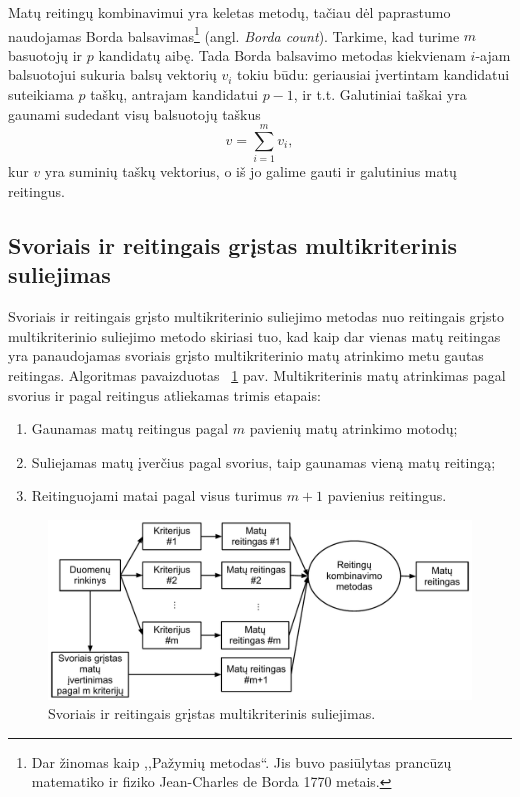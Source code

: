 Matų reitingų kombinavimui yra keletas metodų\cite{dwork2001rank}, tačiau dėl paprastumo naudojamas Borda balsavimas\footnote{Dar žinomas kaip ,,Pažymių metodas``. Jis buvo pasiūlytas prancūzų matematiko ir fiziko Jean-Charles de Borda 1770 metais.} (angl.\textit{ Borda count}). Tarkime, kad turime $m$ basuotojų ir $p$ kandidatų aibę. Tada Borda balsavimo metodas kiekvienam $i$-ajam balsuotojui sukuria balsų vektorių $v_i$ tokiu būdu: geriausiai įvertintam kandidatui suteikiama $p$ taškų, antrajam kandidatui $p-1$, ir t.t. Galutiniai taškai yra gaunami sudedant visų balsuotojų taškus
\begin{equation}
 v = \sum_{i=1}^m v_i,
\end{equation}
kur $v$ yra suminių taškų vektorius, o iš jo galime gauti ir galutinius matų reitingus.

\subsection{Svoriais ir reitingais grįstas multikriterinis suliejimas}

Svoriais ir reitingais grįsto multikriterinio suliejimo metodas nuo reitingais grįsto multikriterinio suliejimo metodo skiriasi tuo, kad kaip dar vienas matų reitingas yra panaudojamas svoriais grįsto multikriterinio matų atrinkimo metu gautas reitingas. Algoritmas pavaizduotas ~\ref{fig:figure3} pav. Multikriterinis matų atrinkimas pagal svorius ir pagal reitingus atliekamas trimis etapais:
\begin{enumerate}
  \item Gaunamas matų reitingus pagal $m$ pavienių matų atrinkimo motodų;
  \item Suliejamas matų įverčius pagal svorius, taip gaunamas vieną matų reitingą;
  \item Reitinguojami matai pagal visus turimus $m+1$ pavienius reitingus.
\end{enumerate} 
\begin{figure}
 \centering
 \includegraphics[width=1\textwidth]{images/score_and_ranking_based_fusion.pdf}
 \caption{Svoriais ir reitingais grįstas multikriterinis suliejimas.}
 \label{fig:figure3}
\end{figure}

